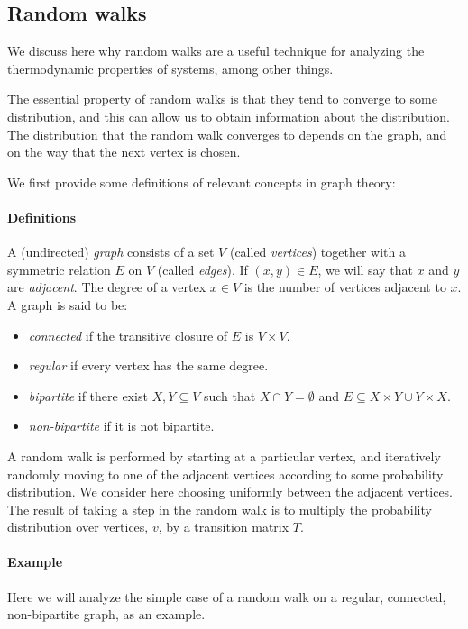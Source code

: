 \documentclass{article}
\begin{document}
\subsection{Random walks}
\label{sec:random_walks}
We discuss here why random walks are a useful technique for analyzing the thermodynamic properties of systems, among other things.

The essential property of random walks is that they tend to converge to some distribution, and this can allow us to obtain information about the distribution.
The distribution that the random walk converges to depends on the graph, and on the way that the next vertex is chosen.

We first provide some definitions of relevant concepts in graph theory:
\paragraph{Definitions}
A (undirected) \emph{graph} consists of a set $V$ (called \emph{vertices}) together with a symmetric relation $E$ on $V$ (called \emph{edges}).
If $(x, y) \in E$, we will say that $x$ and $y$ are \emph{adjacent}.
The degree of a vertex $x \in V$ is the number of vertices adjacent to $x$.
A graph is said to be:
\begin{itemize}
\item \emph{connected} if the transitive closure of $E$ is $V\times V$.
\item \emph{regular} if every vertex has the same degree.
\item \emph{bipartite} if there exist $X, Y \subseteq V$ such that $X\cap Y = \emptyset$ and $E \subseteq X\times Y \cup Y\times X$.
\item \emph{non-bipartite} if it is not bipartite.
\end{itemize}

A random walk is performed by starting at a particular vertex, and iteratively randomly moving to one of the adjacent vertices according to some probability distribution.
We consider here choosing uniformly between the adjacent vertices.
The result of taking a step in the random walk is to multiply the probability distribution over vertices, $v$, by a transition matrix $T$.

\paragraph{Example}
Here we will analyze the simple case of a random walk on a regular, connected, non-bipartite graph, as an example.
\end{document}

